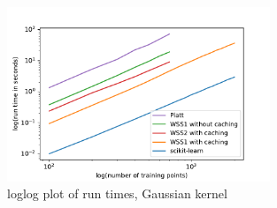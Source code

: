 \begin{figure}[h!]
	\includegraphics[width=0.7\textwidth, center]{benchplot_gauss_loglog.pdf}
	\caption{loglog plot of run times, Gaussian kernel}
	\label{bench_gauss_loglog}
\end{figure}





\newpage